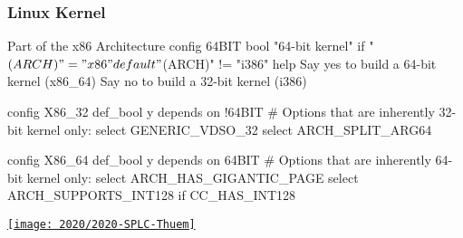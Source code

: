 \subsubsection*{Linux Kernel}

\begin{frame}[fragile]{\myframetitle}
	\begin{mycolumns}
		\begin{kconfigtight}[basicstyle=\small]{Part of the x86 Architecture }
config 64BIT
	bool "64-bit kernel" if "$(ARCH)" = "x86"
	default "$(ARCH)" != "i386"
	help
		Say yes to build a 64-bit kernel (x86_64)
		Say no to build a 32-bit kernel (i386)

config X86_32
	def_bool y
	depends on !64BIT
	# Options that are inherently 32-bit kernel only:
	select GENERIC_VDSO_32
	select ARCH_SPLIT_ARG64

config X86_64
	def_bool y
	depends on 64BIT
	# Options that are inherently 64-bit kernel only:
	select ARCH_HAS_GIGANTIC_PAGE
	select ARCH_SUPPORTS_INT128 if CC_HAS_INT128
\end{kconfigtight}
	\mynextcolumn
	\hspace*{-3mm}\href{https://dl.acm.org/doi/abs/10.1145/3382025.3414943}{\texttt{[image: 2020/2020-SPLC-Thuem]}}
	\end{mycolumns}
\end{frame}